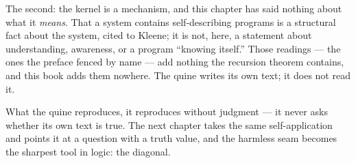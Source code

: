 The second: the kernel is a mechanism, and this chapter has said nothing
about what it \emph{means}. That a system contains self-describing
programs is a structural fact about the system, cited to Kleene; it is
not, here, a statement about understanding, awareness, or a program
``knowing itself.'' Those readings --- the ones the preface fenced by
name --- add nothing the recursion theorem contains, and this book adds
them nowhere. The quine writes its own text; it does not read it.

What the quine reproduces, it reproduces without judgment --- it never
asks whether its own text is true. The next chapter takes the same
self-application and points it at a question with a truth value, and the
harmless seam becomes the sharpest tool in logic: the diagonal.
